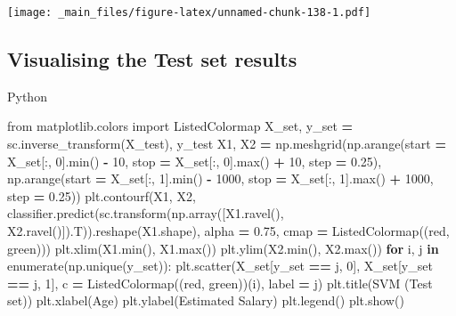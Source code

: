 \documentclass[
]{book}
\newenvironment{Shaded}{\begin{snugshade}}{\end{snugshade}}
\newcommand{\BuiltInTok}[1]{#1}
\newcommand{\ControlFlowTok}[1]{\textcolor[rgb]{0.13,0.29,0.53}{\textbf{#1}}}
\newcommand{\DecValTok}[1]{\textcolor[rgb]{0.00,0.00,0.81}{#1}}
\newcommand{\FloatTok}[1]{\textcolor[rgb]{0.00,0.00,0.81}{#1}}
\newcommand{\ImportTok}[1]{#1}
\newcommand{\KeywordTok}[1]{\textcolor[rgb]{0.13,0.29,0.53}{\textbf{#1}}}
\newcommand{\NormalTok}[1]{#1}
\newcommand{\OperatorTok}[1]{\textcolor[rgb]{0.81,0.36,0.00}{\textbf{#1}}}
\newcommand{\StringTok}[1]{\textcolor[rgb]{0.31,0.60,0.02}{#1}}
\theoremstyle{definition}
\theoremstyle{definition}
\theoremstyle{definition}
\theoremstyle{definition}
\theoremstyle{remark}
\begin{document}
\texttt{[image: \_main\_files/figure-latex/unnamed-chunk-138-1.pdf]}

\hypertarget{visualising-the-test-set-results-3}{%
\subsection{Visualising the Test set results}\label{visualising-the-test-set-results-3}}

Python

\begin{Shaded}
\begin{Highlighting}[]
\ImportTok{from}\NormalTok{ matplotlib.colors }\ImportTok{import}\NormalTok{ ListedColormap}
\NormalTok{X\_set, y\_set }\OperatorTok{=}\NormalTok{ sc.inverse\_transform(X\_test), y\_test}
\NormalTok{X1, X2 }\OperatorTok{=}\NormalTok{ np.meshgrid(np.arange(start }\OperatorTok{=}\NormalTok{ X\_set[:, }\DecValTok{0}\NormalTok{].}\BuiltInTok{min}\NormalTok{() }\OperatorTok{{-}} \DecValTok{10}\NormalTok{, stop }\OperatorTok{=}\NormalTok{ X\_set[:, }\DecValTok{0}\NormalTok{].}\BuiltInTok{max}\NormalTok{() }\OperatorTok{+} \DecValTok{10}\NormalTok{, step }\OperatorTok{=} \FloatTok{0.25}\NormalTok{),}
\NormalTok{                     np.arange(start }\OperatorTok{=}\NormalTok{ X\_set[:, }\DecValTok{1}\NormalTok{].}\BuiltInTok{min}\NormalTok{() }\OperatorTok{{-}} \DecValTok{1000}\NormalTok{, stop }\OperatorTok{=}\NormalTok{ X\_set[:, }\DecValTok{1}\NormalTok{].}\BuiltInTok{max}\NormalTok{() }\OperatorTok{+} \DecValTok{1000}\NormalTok{, step }\OperatorTok{=} \FloatTok{0.25}\NormalTok{))}
\NormalTok{plt.contourf(X1, X2, classifier.predict(sc.transform(np.array([X1.ravel(), X2.ravel()]).T)).reshape(X1.shape),}
\NormalTok{             alpha }\OperatorTok{=} \FloatTok{0.75}\NormalTok{, cmap }\OperatorTok{=}\NormalTok{ ListedColormap((}\StringTok{\textquotesingle{}red\textquotesingle{}}\NormalTok{, }\StringTok{\textquotesingle{}green\textquotesingle{}}\NormalTok{)))}
\NormalTok{plt.xlim(X1.}\BuiltInTok{min}\NormalTok{(), X1.}\BuiltInTok{max}\NormalTok{())}
\NormalTok{plt.ylim(X2.}\BuiltInTok{min}\NormalTok{(), X2.}\BuiltInTok{max}\NormalTok{())}
\ControlFlowTok{for}\NormalTok{ i, j }\KeywordTok{in} \BuiltInTok{enumerate}\NormalTok{(np.unique(y\_set)):}
\NormalTok{    plt.scatter(X\_set[y\_set }\OperatorTok{==}\NormalTok{ j, }\DecValTok{0}\NormalTok{], X\_set[y\_set }\OperatorTok{==}\NormalTok{ j, }\DecValTok{1}\NormalTok{], c }\OperatorTok{=}\NormalTok{ ListedColormap((}\StringTok{\textquotesingle{}red\textquotesingle{}}\NormalTok{, }\StringTok{\textquotesingle{}green\textquotesingle{}}\NormalTok{))(i), label }\OperatorTok{=}\NormalTok{ j)}
\NormalTok{plt.title(}\StringTok{\textquotesingle{}SVM (Test set)\textquotesingle{}}\NormalTok{)}
\NormalTok{plt.xlabel(}\StringTok{\textquotesingle{}Age\textquotesingle{}}\NormalTok{)}
\NormalTok{plt.ylabel(}\StringTok{\textquotesingle{}Estimated Salary\textquotesingle{}}\NormalTok{)}
\NormalTok{plt.legend()}
\NormalTok{plt.show()}
\end{Highlighting}
\end{Shaded}
\end{document}
